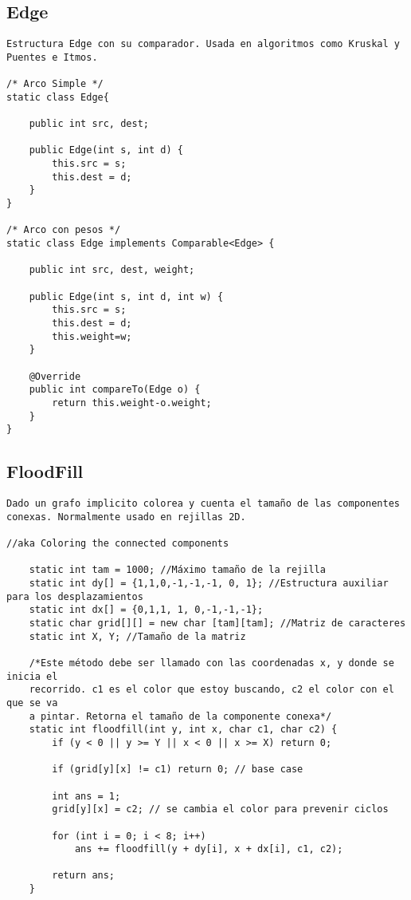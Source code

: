 \documentclass[10pt,letterpaper,twocolumn,twosided]{article}
\begin{document}
\subsection{Edge}
\begin{lstlisting}
Estructura Edge con su comparador. Usada en algoritmos como Kruskal y Puentes e Itmos.

/* Arco Simple */
static class Edge{

    public int src, dest;
    
    public Edge(int s, int d) {
        this.src = s;
        this.dest = d;
    }
}

/* Arco con pesos */
static class Edge implements Comparable<Edge> {

    public int src, dest, weight;
    
    public Edge(int s, int d, int w) {
        this.src = s;
        this.dest = d;
        this.weight=w;
    }
    
    @Override
    public int compareTo(Edge o) {
        return this.weight-o.weight;
    }
}\end{lstlisting}

\subsection{FloodFill}
\begin{lstlisting}
Dado un grafo implicito colorea y cuenta el tamaño de las componentes conexas. Normalmente usado en rejillas 2D.

//aka Coloring the connected components

	static int tam = 1000; //Máximo tamaño de la rejilla
	static int dy[] = {1,1,0,-1,-1,-1, 0, 1}; //Estructura auxiliar para los desplazamientos
	static int dx[] = {0,1,1, 1, 0,-1,-1,-1};
	static char grid[][] = new char [tam][tam]; //Matriz de caracteres
	static int X, Y; //Tamaño de la matriz
	
	/*Este método debe ser llamado con las coordenadas x, y donde se inicia el 
	recorrido. c1 es el color que estoy buscando, c2 el color con el que se va 
	a pintar. Retorna el tamaño de la componente conexa*/
	static int floodfill(int y, int x, char c1, char c2) { 
		if (y < 0 || y >= Y || x < 0 || x >= X) return 0;
		
		if (grid[y][x] != c1) return 0; // base case
		
		int ans = 1; 
		grid[y][x] = c2; // se cambia el color para prevenir ciclos
		
		for (int i = 0; i < 8; i++)
			ans += floodfill(y + dy[i], x + dx[i], c1, c2);
		
		return ans;
	}
\end{lstlisting}
\end{document}
